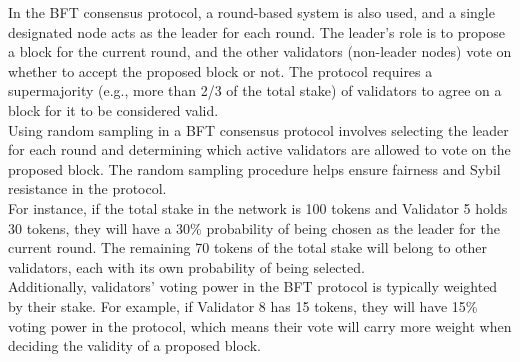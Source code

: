 In the BFT consensus protocol, a round-based system is also used, and a single designated node acts as the leader for each round. The leader's role is to propose a block for the current round, and the other validators (non-leader nodes) vote on whether to accept the proposed block or not. The protocol requires a supermajority (e.g., more than 2/3 of the total stake) of validators to agree on a block for it to be considered valid.\\
Using random sampling in a BFT consensus protocol involves selecting the leader for each round and determining which active validators are allowed to vote on the proposed block. The random sampling procedure helps ensure fairness and Sybil resistance in the protocol.\\
For instance, if the total stake in the network is 100 tokens and Validator 5 holds 30 tokens, they will have a 30\% probability of being chosen as the leader for the current round. The remaining 70 tokens of the total stake will belong to other validators, each with its own probability of being selected.\\
Additionally, validators' voting power in the BFT protocol is typically weighted by their stake. For example, if Validator 8 has 15 tokens, they will have 15\% voting power in the protocol, which means their vote will carry more weight when deciding the validity of a proposed block.

